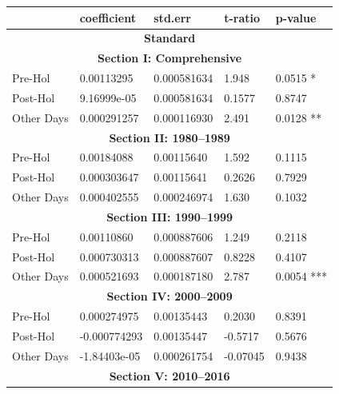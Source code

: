 \documentclass[11pt, english]{article}
\begin{document}
	\newpage

	\begin{center}
                \scriptsize
        \begin{longtable}{p{2cm}p{2cm}p{2cm}p{2cm}p{2cm}}
                & \textbf{coefficient} & \textbf{std.err} & \textbf{t-ratio} & \textbf{p-value}\\
                \hline
                \hline
                \multicolumn{5}{c}{\textbf{Standard}}\\
                \hline
                \hline
                \multicolumn{5}{c}{\textbf{Section I: Comprehensive}}\\
                \hline
                Pre-Hol & 0.00113295 & 0.000581634 & 1.948 & 0.0515 *\\
                Post-Hol & 9.16999e-05 & 0.000581634 & 0.1577 & 0.8747\\
                Other Days & 0.000291257 & 0.000116930 & 2.491 & 0.0128 **\\
                \hline
                \multicolumn{5}{c}{\textbf{Section II: 1980--1989}}\\
                \hline            
                Pre-Hol & 0.00184088 & 0.00115640 & 1.592 & 0.1115\\ 
                Post-Hol & 0.000303647 & 0.00115641 & 0.2626 & 0.7929\\  
                Other Days & 0.000402555 & 0.000246974 & 1.630 & 0.1032\\
                \hline
                \multicolumn{5}{c}{\textbf{Section III: 1990--1999}}\\
                \hline            
                Pre-Hol & 0.00110860 & 0.000887606 & 1.249 & 0.2118\\ 
                Post-Hol & 0.000730313 & 0.000887607 & 0.8228 & 0.4107\\  
                Other Days & 0.000521693 & 0.000187180 & 2.787 & 0.0054 ***\\
                \hline
                \multicolumn{5}{c}{\textbf{Section IV: 2000--2009}}\\
                \hline            
                Pre-Hol & 0.000274975 & 0.00135443 & 0.2030 & 0.8391\\ 
                Post-Hol & -0.000774293 & 0.00135447 & -0.5717 & 0.5676\\  
                Other Days & -1.84403e-05 & 0.000261754 & -0.07045 & 0.9438\\
                \hline
                \multicolumn{5}{c}{\textbf{Section V: 2010--2016}}\\

\end{longtable}
\end{center}
\end{document}
